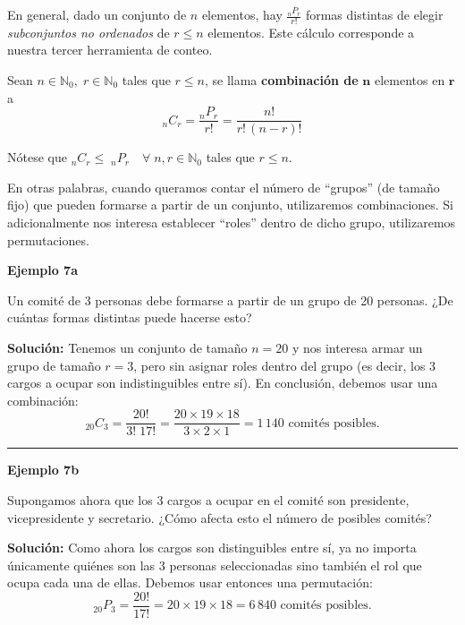 \documentclass[
  letterpaper,
  DIV=11,
  numbers=noendperiod]{scrreprt}
\begin{document}
En general, dado un conjunto de \(n\) elementos, hay
\(\textstyle\frac{_nP_r}{r!}\) formas distintas de elegir
\emph{subconjuntos no ordenados} de \(r \leq n\) elementos. Este cálculo
corresponde a nuestra tercer herramienta de conteo.

Sean \(n \in \mathbb{N}_0, \; r \in \mathbb{N}_0\) tales que
\(r \leq n\), se llama \textbf{combinación de} \(\mathbf{n}\) elementos
en \(\mathbf{r}\) a
\[_nC_r = \frac{_nP_r}{r!} = \frac{n!}{r! \, (n-r)!}\]

Nótese que
\(_nC_r \leq \; _nP_r \quad \forall \; n, r \in \mathbb{N}_0\) tales que
\(r \leq n\).

En otras palabras, cuando queramos contar el número de ``grupos'' (de
tamaño fijo) que pueden formarse a partir de un conjunto, utilizaremos
combinaciones. Si adicionalmente nos interesa establecer ``roles''
dentro de dicho grupo, utilizaremos permutaciones.

\begin{examplebox}

\begin{center}
\textbf{Ejemplo 7a}

\end{center}

Un comité de 3 personas debe formarse a partir de un grupo de 20
personas. ¿De cuántas formas distintas puede hacerse esto?

\textbf{Solución:} Tenemos un conjunto de tamaño \(n=20\) y nos interesa
armar un grupo de tamaño \(r=3\), pero sin asignar roles dentro del
grupo (es decir, los 3 cargos a ocupar son indistinguibles entre sí). En
conclusión, debemos usar una combinación:
\[_{20}C_3 = \frac{20!}{3!\;17!} = \frac{20 \times 19 \times 18}{3 \times 2 \times 1} = 1\,140 \text{ comités posibles.}\]

\begin{center}\rule{0.5\linewidth}{0.5pt}\end{center}

\begin{center}
\textbf{Ejemplo 7b}

\end{center}

Supongamos ahora que los 3 cargos a ocupar en el comité son presidente,
vicepresidente y secretario. ¿Cómo afecta esto el número de posibles
comités?

\textbf{Solución:} Como ahora los cargos son distinguibles entre sí, ya
no importa únicamente quiénes son las 3 personas seleccionadas sino
también el rol que ocupa cada una de ellas. Debemos usar entonces una
permutación:
\[_{20}P_3 = \frac{20!}{17!} = 20 \times 19 \times 18 = 6\,840 \text{ comités posibles.}\]

\end{examplebox}
\end{document}

